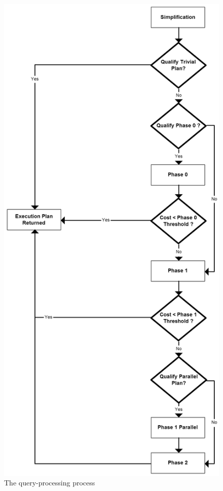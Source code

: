 \documentclass{cslthse-msc}
\begin{document}
\begin{figure}[H] 
\begin{center}
    \includegraphics[scale=0.3]{Pictures/Optimization-process.png}
  \end{center}
  \vspace{-20pt}
  \caption{The query-processing process}
  \label{fig:qpp}
  \vspace{-10pt}
\end{figure}
\end{document}
